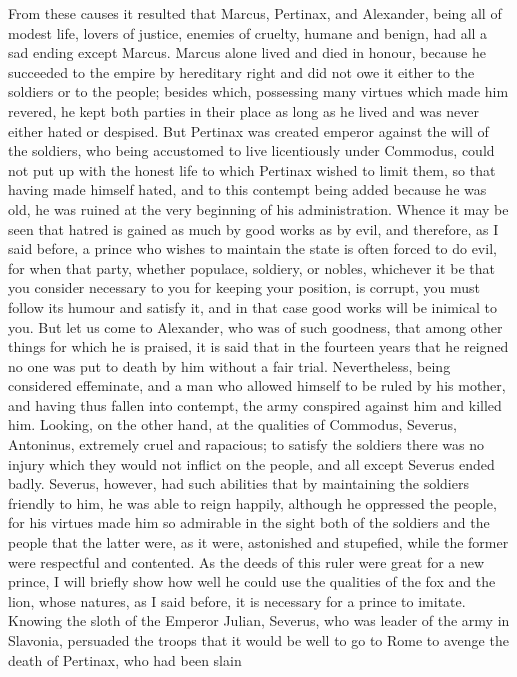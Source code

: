 \documentclass[12pt,letterpaper]{memoir}
\begin{document}
From these causes it resulted that Marcus, Pertinax, and Alexander,
being all of modest life, lovers of justice, enemies of cruelty,
humane and benign, had all a sad ending except Marcus. Marcus alone
lived and died in honour, because he succeeded to the empire by
hereditary right and did not owe it either to the soldiers or to the
people; besides which, possessing many virtues which made him revered,
he kept both parties in their place as long as he lived and was never
either hated or despised. But Pertinax was created emperor against the
will of the soldiers, who being accustomed to live licentiously under
Commodus, could not put up with the honest life to which Pertinax
wished to limit them, so that having made himself hated, and to this
contempt being added because he was old, he was ruined at the very
beginning of his administration. Whence it may be seen that hatred
is gained as much by good works as by evil, and therefore, as I said
before, a prince who wishes to maintain the state is often forced to
do evil, for when that party, whether populace, soldiery, or nobles,
whichever it be that you consider necessary to you for keeping your
position, is corrupt, you must follow its humour and satisfy it, and
in that case good works will be inimical to you. But let us come to
Alexander, who was of such goodness, that among other things for which
he is praised, it is said that in the fourteen years that he reigned
no one was put to death by him without a fair trial. Nevertheless,
being considered effeminate, and a man who allowed himself to be
ruled by his mother, and having thus fallen into contempt, the army
conspired against him and killed him. Looking, on the other hand,
at the qualities of Commodus, Severus, Antoninus, extremely cruel
and rapacious; to satisfy the soldiers there was no injury which
they would not inflict on the people, and all except Severus ended
badly. Severus, however, had such abilities that by maintaining the
soldiers friendly to him, he was able to reign happily, although he
oppressed the people, for his virtues made him so admirable in the
sight both of the soldiers and the people that the latter were, as it
were, astonished and stupefied, while the former were respectful and
contented. As the deeds of this ruler were great for a new prince, I
will briefly show how well he could use the qualities of the fox and
the lion, whose natures, as I said before, it is necessary for a prince
to imitate. Knowing the sloth of the Emperor Julian, Severus, who was
leader of the army in Slavonia, persuaded the troops that it would be
well to go to Rome to avenge the death of Pertinax, who had been slain
\end{document}
